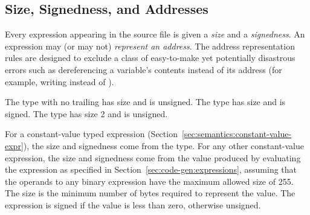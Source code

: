 \documentclass[10pt]{article}
\begin{document}
\subsection{Size, Signedness, and Addresses}
\label{sec:semantics:size}

Every expression appearing in the source file is given a \emph{size}
and a \emph{signedness}.  An expression may (or may not)
\emph{represent an address}.  The address representation rules are
designed to exclude a class of easy-to-make yet potentially disastrous
errors such as dereferencing a variable's contents instead of its
address (for example, writing  instead of
).

 The type
 with no trailing  has size  and is
unsigned.  The type   has size  and
is signed.  The type  has size 2 and is unsigned.

  For a
constant-value typed expression
(Section~\ref{sec:semantics:constant-value-expr}), the size and
signedness come from the type.  For any other constant-value
expression, the size and signedness come from the value produced by
evaluating the expression as specified in
Section~\ref{sec:code-gen:expressions}, assuming that the operands to
any binary expression have the maximum allowed size of 255.  The size
is the minimum number of bytes required to represent the value.  The
expression is signed if the value is less than zero, otherwise
unsigned.
\end{document}
